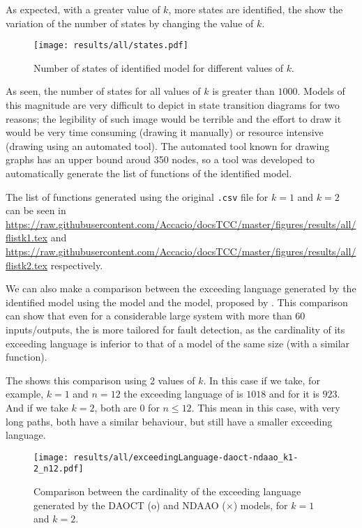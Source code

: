 As expected, with a greater value of $k$, more states are identified, the
 show the variation of the number of
states by changing the value of $k$.
\begin{figure}[H]
  \centering
  \texttt{[image: results/all/states.pdf]}
  \caption{Number of states of identified model for different values of $k$.}
    \label{fig:statesIdentOriginal}
\end{figure}

As seen, the number of states for all values of $k$ is greater than $1000$. Models of this magnitude are very difficult to depict in state transition
diagrams for two reasons; the legibility of such image would be terrible and the
effort to draw it would be very time consuming (drawing it manually) or resource
intensive (drawing using an automated tool). The automated tool known for drawing
graphs has an upper bound aroud 350 nodes, so a tool was developed to
automatically generate the list of \ffunction{} functions of the identified model.

The  list of \ffunction{} functions generated using the original \verb|.csv| file
for $k=1$ and $k=2$
can be seen in  
\url{https://raw.githubusercontent.com/Accacio/docsTCC/master/figures/results/all/flistk1.tex}
and
\url{https://raw.githubusercontent.com/Accacio/docsTCC/master/figures/results/all/flistk2.tex}
respectively.

We can also make a comparison between the exceeding language generated by the
identified model using the \DAOCT{} model and the \NDAAO{} model, proposed by
\cite{klein2005fault}. This comparison can show that even for a considerable
large system with more than 60 inputs\slash outputs, the \DAOCT{} is more
tailored for fault detection, as the cardinality of its exceeding language is
inferior to that of a \NDAAO{} model of the same size (with a similar \ffunction{} function).

The  shows this comparison using 2 values of $k$.
In this case if we take, for example, $k=1$ and $n=12$ the
exceeding language of \NDAAO{} is $1018$ and for \DAOCT{} it is $923$. And
if we take $k=2$, both are $0$ for $n\leq12$. This mean in this case, with very
long paths, both have a similar behaviour, but \DAOCT{} still have a smaller exceeding language.
\begin{figure}[H]
  \centering
  \texttt{[image: results/all/exceedingLanguage-daoct-ndaao\_k1-2\_n12.pdf]}
  \caption{Comparison between the cardinality of the exceeding language generated by the DAOCT (o) and
NDAAO ($\times$) models, for $k=1$ and $k=2$.}
    \label{fig:daoctNdaaoOriginal}
\end{figure}

